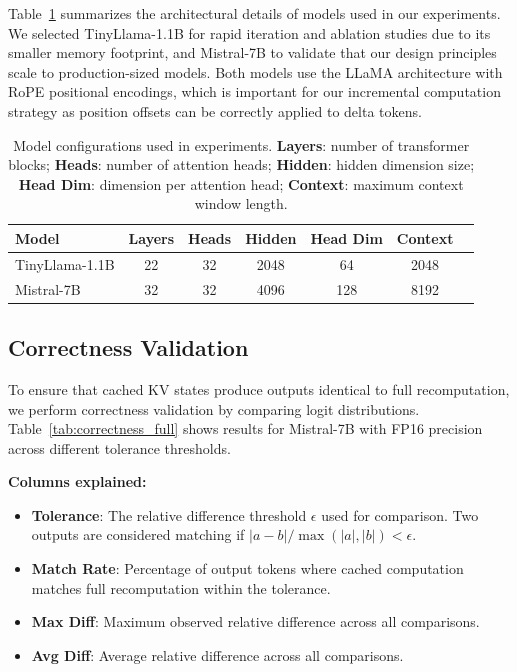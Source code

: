 \documentclass{article}
\begin{document}
Table~\ref{tab:model_config_full} summarizes the architectural details of models used in our experiments.
We selected TinyLlama-1.1B for rapid iteration and ablation studies due to its smaller memory footprint, and Mistral-7B to validate that our design principles scale to production-sized models.
Both models use the LLaMA architecture with RoPE positional encodings, which is important for our incremental computation strategy as position offsets can be correctly applied to delta tokens.

\begin{table}[h]
\centering
\caption{Model configurations used in experiments. \textbf{Layers}: number of transformer blocks; \textbf{Heads}: number of attention heads; \textbf{Hidden}: hidden dimension size; \textbf{Head Dim}: dimension per attention head; \textbf{Context}: maximum context window length.}
\label{tab:model_config_full}
\begin{tabular}{lcccccc}
\toprule
Model & Layers & Heads & Hidden & Head Dim & Context \\
\midrule
TinyLlama-1.1B & 22 & 32 & 2048 & 64 & 2048 \\
Mistral-7B & 32 & 32 & 4096 & 128 & 8192 \\
\bottomrule
\end{tabular}
\end{table}

\subsection{Correctness Validation}

To ensure that cached KV states produce outputs identical to full recomputation, we perform correctness validation by comparing logit distributions.
Table~\ref{tab:correctness_full} shows results for Mistral-7B with FP16 precision across different tolerance thresholds.

\textbf{Columns explained:}
\begin{itemize}
    \item \textbf{Tolerance}: The relative difference threshold $\epsilon$ used for comparison. Two outputs are considered matching if $|a - b| / \max(|a|, |b|) < \epsilon$.
    \item \textbf{Match Rate}: Percentage of output tokens where cached computation matches full recomputation within the tolerance.
    \item \textbf{Max Diff}: Maximum observed relative difference across all comparisons.
    \item \textbf{Avg Diff}: Average relative difference across all comparisons.
\end{itemize}
\end{document}
